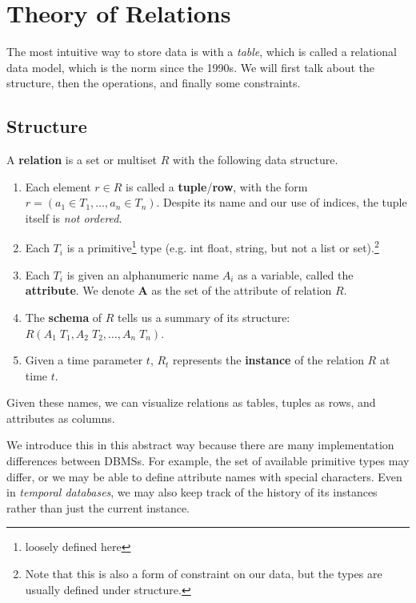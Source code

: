 \section{Theory of Relations}

  The most intuitive way to store data is with a \textit{table}, which is called a relational data model, which is the norm since the 1990s. We will first talk about the structure, then the operations, and finally some constraints. 

\subsection{Structure}

  \begin{definition}[Relation]
    A \textbf{relation} is a set or multiset $R$ with the following data structure. 
    \begin{enumerate}
      \item Each element $r \in R$ is called a \textbf{tuple}/\textbf{row}, with the form $r = (a_1 \in T_1, \ldots, a_n \in T_n)$. Despite its name and our use of indices, the tuple itself is \textit{not ordered}. 
      \item Each $T_i$ is a primitive\footnote{loosely defined here} type (e.g. int float, string, but not a list or set).\footnote{Note that this is also a form of constraint on our data, but the types are usually defined under structure.}
      \item Each $T_i$ is given an alphanumeric name $A_i$ as a variable, called the \textbf{attribute}. We denote $\mathbf{A}$ as the set of the attribute of relation $R$. 
      \item The \textbf{schema} of $R$ tells us a summary of its structure: $R(A_1 \; T_1, A_2 \; T_2, \ldots, A_n \; T_n)$. 
      \item Given a time parameter $t$, $R_t$ represents the \textbf{instance} of the relation $R$ at time $t$. 
    \end{enumerate}
    Given these names, we can visualize relations as tables, tuples as rows, and attributes as columns. 
  \end{definition} 

  We introduce this in this abstract way because there are many implementation differences between DBMSs. For example, the set of available primitive types may differ, or we may be able to define attribute names with special characters. Even in \textit{temporal databases}, we may also keep track of the history of its instances rather than just the current instance. 

